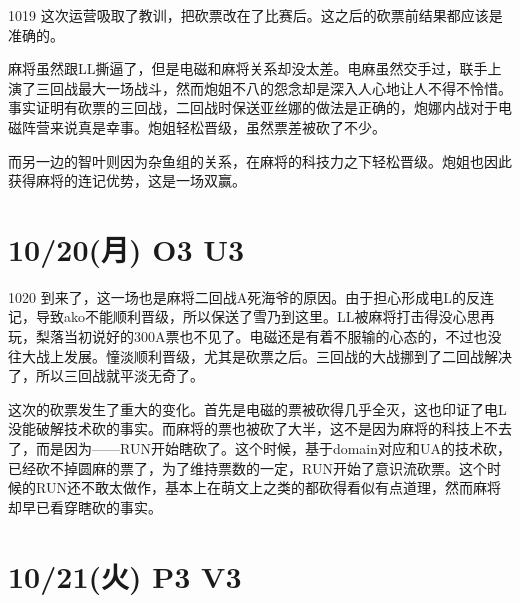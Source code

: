 1019 这次运营吸取了教训，把砍票改在了比赛后。这之后的砍票前结果都应该是准确的。

麻将虽然跟LL撕逼了，但是电磁和麻将关系却没太差。电麻虽然交手过，联手上演了三回战最大一场战斗，然而炮姐不八的怨念却是深入人心地让人不得不怜惜。事实证明有砍票的三回战，二回战时保送亚丝娜的做法是正确的，炮娜内战对于电磁阵营来说真是幸事。炮姐轻松晋级，虽然票差被砍了不少。

而另一边的智叶则因为杂鱼组的关系，在麻将的科技力之下轻松晋级。炮姐也因此获得麻将的连记优势，这是一场双赢。

\section{10/20(月) O3 U3}


1020 到来了，这一场也是麻将二回战A死海爷的原因。由于担心形成电L的反连记，导致ako不能顺利晋级，所以保送了雪乃到这里。LL被麻将打击得没心思再玩，梨落当初说好的300A票也不见了。电磁还是有着不服输的心态的，不过也没往大战上发展。憧淡顺利晋级，尤其是砍票之后。三回战的大战挪到了二回战解决了，所以三回战就平淡无奇了。

这次的砍票发生了重大的变化。首先是电磁的票被砍得几乎全灭，这也印证了电L没能破解技术砍的事实。而麻将的票也被砍了大半，这不是因为麻将的科技上不去了，而是因为——RUN开始瞎砍了。这个时候，基于domain对应和UA的技术砍，已经砍不掉圆麻的票了，为了维持票数的一定，RUN开始了意识流砍票。这个时候的RUN还不敢太做作，基本上在萌文上之类的都砍得看似有点道理，然而麻将却早已看穿瞎砍的事实。

\section{10/21(火) P3 V3}


